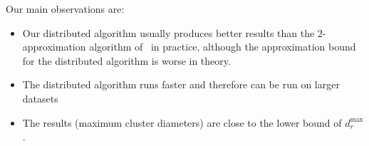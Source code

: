 Our main observations are:

\begin{itemize}
\item Our distributed algorithm usually produces better results than the $2$-approximation algorithm of~\cite{Aggarwal06achievinganonymity} in practice, although the approximation bound for the distributed algorithm is worse in theory.
\item The distributed algorithm runs faster and therefore can be run on larger datasets
\item The results (maximum cluster diameters) are close to the lower bound of $d_{r}^{\max}$.
\end{itemize}


%

